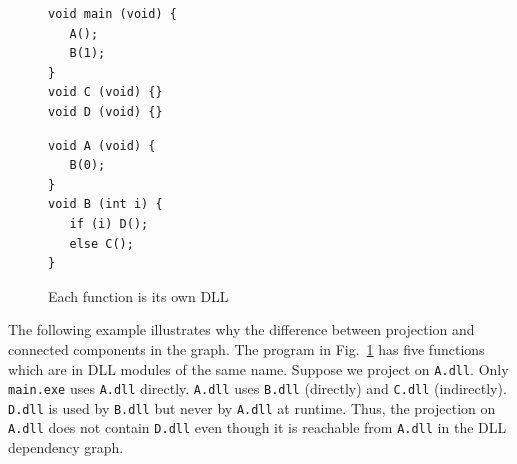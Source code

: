 \begin{figure}
\begin{minipage}[t]{3.5cm}
\begin{verbatim}
void main (void) {
   A();
   B(1);
}
void C (void) {}
void D (void) {}
\end{verbatim}
\end{minipage}
\hspace{1.0cm}
\begin{minipage}[t]{3.0cm}
\begin{verbatim}
void A (void) {
   B(0);
}
void B (int i) {
   if (i) D();
   else C();
}
\end{verbatim}
\end{minipage}
\caption{Each function is its own DLL}
\label{fig:indcalls}
\end{figure}

The following example illustrates why the difference between
projection and connected components in the graph.
The program in Fig.~\ref{fig:indcalls} has
five functions which are in DLL modules of the same name.
Suppose we project on {\tt A.dll}.
Only {\tt main.exe} uses {\tt A.dll} directly.
{\tt A.dll} uses {\tt B.dll} (directly) and
{\tt C.dll} (indirectly).
{\tt D.dll} is used by {\tt B.dll} but never by {\tt A.dll} at runtime.
Thus, the projection on {\tt A.dll} does not contain {\tt D.dll} even though
it is reachable from {\tt A.dll} in the DLL dependency graph.

